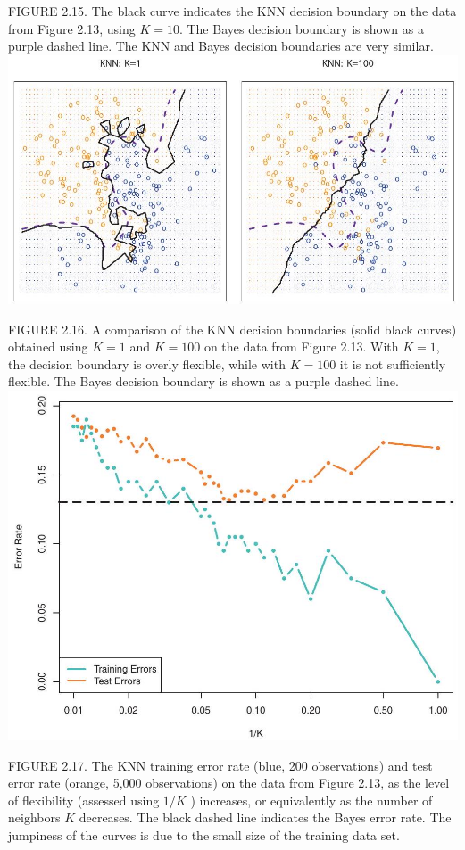 \documentclass[10pt]{article}
\begin{document}
FIGURE 2.15. The black curve indicates the KNN decision boundary on the data from Figure 2.13, using $K=10$. The Bayes decision boundary is shown as a purple dashed line. The KNN and Bayes decision boundaries are very similar.\\
\includegraphics[max width=\textwidth, center]{2025_05_05_efe77898333945044de4g-056(1)}

FIGURE 2.16. A comparison of the KNN decision boundaries (solid black curves) obtained using $K=1$ and $K=100$ on the data from Figure 2.13. With $K=1$, the decision boundary is overly flexible, while with $K=100$ it is not sufficiently flexible. The Bayes decision boundary is shown as a purple dashed line.\\
\includegraphics[max width=\textwidth, center]{2025_05_05_efe77898333945044de4g-057}

FIGURE 2.17. The KNN training error rate (blue, 200 observations) and test error rate (orange, 5,000 observations) on the data from Figure 2.13, as the level of flexibility (assessed using $1 / K$ ) increases, or equivalently as the number of neighbors $K$ decreases. The black dashed line indicates the Bayes error rate. The jumpiness of the curves is due to the small size of the training data set.
\end{document}

